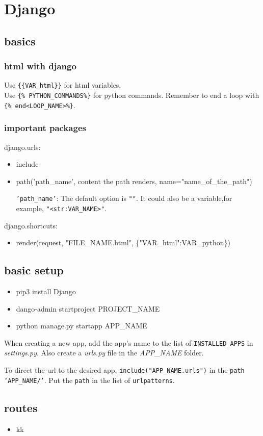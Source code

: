 \documentclass[a4paper]{article}
\newcommand{\hN}{\_NAME}
\begin{document}
\section{Django}
\subsection{basics}
	\subsubsection{html with django}
	Use \texttt{\{\{VAR\_html\}\}} for html variables.\\
	Use \texttt{\{\% PYTHON\_COMMANDS\%\}} for python commands. Remember to end a loop with \texttt{\{\% end<LOOP\_NAME>\%\}}.
	\subsubsection{important packages}
	\ttfamily
	django.urls:
	\begin{itemize}
		\item include
		\item path('path\_name', content the path renders, name="name\_of\_the\_path")
		
		\textnormal{
		\texttt{'path\_name'}:
		The default option is \texttt{""}. It could also be a variable,for example, \texttt{"<str:VAR\_NAME>"}.
		}
	\end{itemize}
	django.shortcuts:
	\begin{itemize}
		\item render(request, "FILE\_NAME.html", \{"VAR\_html":VAR\_python\})
	\end{itemize}
	\subsection{basic setup}
	\begin{itemize}
	\ttfamily
		\item pip3 install Django
		\item dango-admin startproject PROJECT\hN
		\item python manage.py startapp APP\hN
	\end{itemize}
	\normalfont
	When creating a new app, add the app's name to the list of \texttt{INSTALLED\_APPS} in \textit{settings.py}. Also create a \textit{urls.py} file in the \textit{APP\hN} folder.
	
	To direct the url to the desired app, \texttt{include("APP\hN.urls")} in the \texttt{path 'APP\hN/'}. Put the \texttt{path} in the list of \texttt{urlpatterns}.		
	\subsection{routes}
		\begin{itemize}
		\item kk
	\end{itemize}
\end{document}

